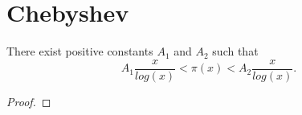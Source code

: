 \section{Chebyshev}

\begin{theorem}
    There exist positive constants $A_1$ and $A_2$ such that
    $$A_1 \frac{x}{log(x)} < \pi(x) < A_2 \frac{x}{log(x)}.$$
    \begin{proof}
    \end{proof}
\end{theorem}